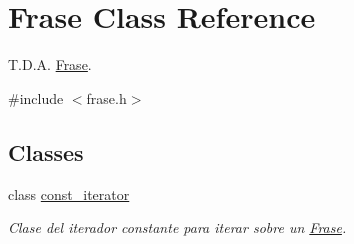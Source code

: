 \hypertarget{class_frase}{}\section{Frase Class Reference}
\label{class_frase}


T.\+D.\+A. \hyperlink{class_frase}{Frase}.  




{\ttfamily \#include $<$frase.\+h$>$}

\subsection*{Classes}
\begin{DoxyCompactItemize}
\item 
class \hyperlink{class_frase_1_1const__iterator}{const\+\_\+iterator}
\begin{DoxyCompactList}\small\item\em Clase del iterador constante para iterar sobre un \hyperlink{class_frase}{Frase}. \end{DoxyCompactList}\end{DoxyCompactItemize}
